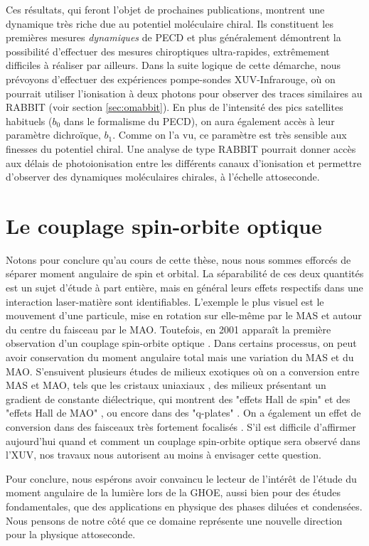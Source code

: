 Ces résultats, qui feront l'objet de prochaines publications, montrent une dynamique très riche due au potentiel moléculaire chiral. Ils constituent les premières mesures \textit{dynamiques} de PECD et plus généralement démontrent la possibilité d'effectuer des mesures chiroptiques ultra-rapides, extrêmement difficiles à réaliser par ailleurs. Dans la suite logique de cette démarche, nous prévoyons d'effectuer des expériences pompe-sondes XUV-Infrarouge, où on pourrait utiliser l'ionisation à deux photons pour observer des traces similaires au RABBIT (voir section \ref{sec:omabbit}). En plus de l'intensité des pics satellites habituels ($b_0$ dans le formalisme du PECD), on aura également accès à leur paramètre dichroïque, $b_1$. Comme on l'a vu, ce paramètre est très sensible aux finesses du potentiel chiral. Une analyse de type RABBIT pourrait donner accès aux délais de photoionisation entre les différents canaux d'ionisation et permettre d'observer des dynamiques moléculaires chirales, à l'échelle attoseconde. 

\section{Le couplage spin-orbite optique}
Notons pour conclure qu'au cours de cette thèse, nous nous sommes efforcés de séparer moment angulaire de spin et orbital. La séparabilité de ces deux quantités est un sujet d'étude à part entière, mais en général leurs effets respectifs dans une interaction laser-matière sont identifiables. L'exemple le plus visuel est le mouvement d'une particule, mise en rotation sur elle-même par le MAS et autour du centre du faisceau par le MAO. Toutefois, en 2001 apparaît la première observation d'un couplage spin-orbite optique . Dans certains processus, on peut avoir conservation du moment angulaire total mais une variation du MAS et du MAO. S'ensuivent plusieurs études de milieux exotiques où on a conversion entre MAS et MAO, tels que les cristaux uniaxiaux , des milieux présentant un gradient de constante diélectrique, qui montrent des "effets Hall de spin"  et des "effets Hall de MAO" , ou encore dans des "q-plates" . On a également un effet de conversion dans des faisceaux très fortement focalisés . S'il est difficile d'affirmer aujourd'hui quand et comment un couplage spin-orbite optique sera observé dans l'XUV, nos travaux nous autorisent au moins à envisager cette question. 

Pour conclure, nous espérons avoir convaincu le lecteur de l'intérêt de l'étude du moment angulaire de la lumière lors de la GHOE, aussi bien pour des études fondamentales, que des applications en physique des phases diluées et condensées. Nous pensons de notre côté que ce domaine représente une nouvelle direction pour la physique attoseconde.